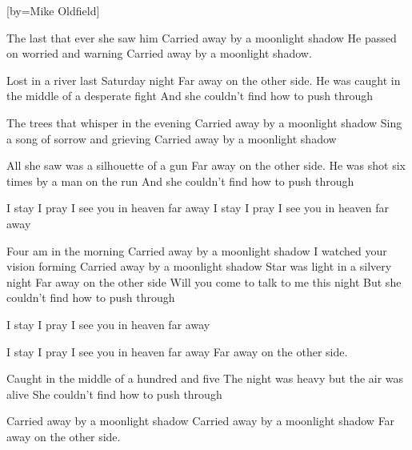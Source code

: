 [by={Mike Oldfield}]

\beginverse
The last that ever she saw him
Carried away by a moonlight shadow
He passed on worried and warning
Carried away by a moonlight shadow.
\endverse

\beginchorus

Lost in a river last Saturday night
Far away on the other side.
He was caught in the middle of a desperate fight
And she couldn't find how to push through
\endchorus

\beginverse


The trees that whisper in the evening
Carried away by a moonlight shadow
Sing a song of sorrow and grieving
Carried away by a moonlight shadow
\endverse

\beginchorus
All she saw was a silhouette of a gun
Far away on the other side.
He was shot six times by a man on the run
And she couldn't find how to push through
\endchorus

\beginchorus

I stay I pray
I see you in heaven far away
I stay I pray
I see you in heaven far away
\endchorus

\beginverse
Four am in the morning
Carried away by a moonlight shadow
I watched your vision forming
Carried away by a moonlight shadow
\endverse
\beginchorus
Star was light in a silvery night
Far away on the other side
Will you come to talk to me this night
But she couldn't find how to push through
\endchorus

\beginchorus
I stay I pray
I see you in heaven far away

I stay I pray
I see you in heaven far away
Far away on the other side.
\endchorus

\beginverse
Caught in the middle of a hundred and five
The night was heavy but the air was alive
She couldn't find how to push through

Carried away by a moonlight shadow
Carried away by a moonlight shadow
Far away on the other side.
\endverse

\endsong

